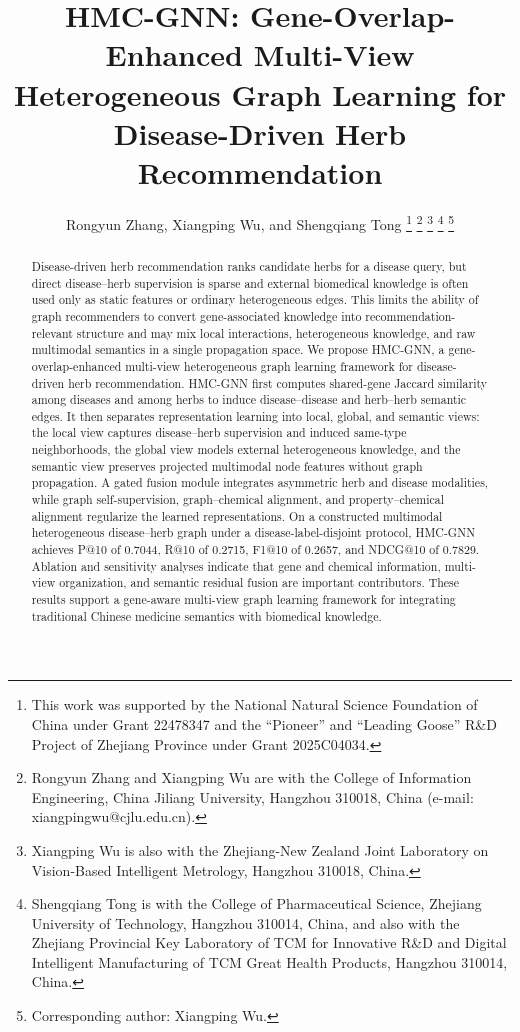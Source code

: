 \documentclass[journal,twoside,web]{ieeecolor}
\begin{document}
\title{HMC-GNN: Gene-Overlap-Enhanced Multi-View Heterogeneous Graph Learning for Disease-Driven Herb Recommendation}
\author{Rongyun Zhang, Xiangping Wu, and Shengqiang Tong
\thanks{This work was supported by the National Natural Science Foundation of China under Grant 22478347 and the ``Pioneer'' and ``Leading Goose'' R\&D Project of Zhejiang Province under Grant 2025C04034.}
\thanks{Rongyun Zhang and Xiangping Wu are with the College of Information Engineering, China Jiliang University, Hangzhou 310018, China (e-mail: xiangpingwu@cjlu.edu.cn).}
\thanks{Xiangping Wu is also with the Zhejiang-New Zealand Joint Laboratory on Vision-Based Intelligent Metrology, Hangzhou 310018, China.}
\thanks{Shengqiang Tong is with the College of Pharmaceutical Science, Zhejiang University of Technology, Hangzhou 310014, China, and also with the Zhejiang Provincial Key Laboratory of TCM for Innovative R\&D and Digital Intelligent Manufacturing of TCM Great Health Products, Hangzhou 310014, China.}
\thanks{Corresponding author: Xiangping Wu.}}

\maketitle

\begin{abstract}
Disease-driven herb recommendation ranks candidate herbs for a disease query, but direct disease--herb supervision is sparse and external biomedical knowledge is often used only as static features or ordinary heterogeneous edges. This limits the ability of graph recommenders to convert gene-associated knowledge into recommendation-relevant structure and may mix local interactions, heterogeneous knowledge, and raw multimodal semantics in a single propagation space. We propose HMC-GNN, a gene-overlap-enhanced multi-view heterogeneous graph learning framework for disease-driven herb recommendation. HMC-GNN first computes shared-gene Jaccard similarity among diseases and among herbs to induce disease--disease and herb--herb semantic edges. It then separates representation learning into local, global, and semantic views: the local view captures disease--herb supervision and induced same-type neighborhoods, the global view models external heterogeneous knowledge, and the semantic view preserves projected multimodal node features without graph propagation. A gated fusion module integrates asymmetric herb and disease modalities, while graph self-supervision, graph--chemical alignment, and property--chemical alignment regularize the learned representations. On a constructed multimodal heterogeneous disease--herb graph under a disease-label-disjoint protocol, HMC-GNN achieves P@10 of 0.7044, R@10 of 0.2715, F1@10 of 0.2657, and NDCG@10 of 0.7829. Ablation and sensitivity analyses indicate that gene and chemical information, multi-view organization, and semantic residual fusion are important contributors. These results support a gene-aware multi-view graph learning framework for integrating traditional Chinese medicine semantics with biomedical knowledge.
\end{abstract}
\end{document}
